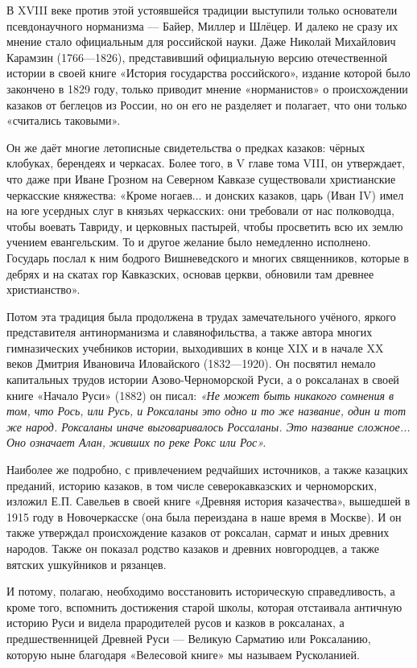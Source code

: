 В XVIII веке против этой устоявшейся традиции выступили только основатели
псевдонаучного норманизма — Байер, Миллер и Шлёцер. И далеко не сразу их мнение
стало официальным для российской науки. Даже Николай Михайлович Карамзин
(1766—1826), представивший официальную версию отечественной истории в своей
книге «История государства российского», издание которой было закончено в 1829
году, только приводит мнение «норманистов» о происхождении казаков от беглецов
из России, но он его не разделяет и полагает, что они только «считались
таковыми».

Он же даёт многие летописные свидетельства о предках казаков: чёрных клобуках,
берендеях и черкасах. Более того, в V главе тома VIII, он утверждает, что даже
при Иване Грозном на Северном Кавказе существовали христианские черкасские
княжества: «Кроме ногаев... и донских казаков, царь (Иван IV) имел на юге
усердных слуг в князьях черкасских: они требовали от нас полководца, чтобы
воевать Тавриду, и церковных пастырей, чтобы просветить всю их землю учением
евангельским. То и другое желание было немедленно исполнено. Государь послал к
ним бодрого Вишневедского и многих священников, которые в дебрях и на скатах
гор Кавказских, основав церкви, обновили там древнее христианство».

Потом эта традиция была продолжена в трудах замечательного учёного, яркого
представителя антинорманизма и славянофильства, а также автора многих
гимназических учебников истории, выходивших в конце XIX и в начале XX веков
Дмитрия Ивановича Иловайского (1832—1920). Он посвятил немало капитальных
трудов истории Азово-Черноморской Руси, а о роксаланах в своей книге «Начало
Руси» (1882) он писал: \emph{«Не может быть никакого сомнения в том, что Рось, или
Русь, и Роксаланы это одно и то же название, один и тот же народ. Роксаланы
иначе выговаривалось Россаланы. Это название сложное... Оно означает Алан,
живших по реке Рокс или Рос».}

Наиболее же подробно, с привлечением редчайших источников, а также казацких
преданий, историю казаков, в том числе северокавказских и черноморских, изложил
Е.П. Савельев в своей книге «Древняя история казачества», вышедшей в 1915 году
в Новочеркасске (она была переиздана в наше время в Москве). И он также
утверждал происхождение казаков от роксалан, сармат и иных древних народов.
Также он показал родство казаков и древних новгородцев, а также вятских
ушкуйников и рязанцев. 

И потому, полагаю, необходимо восстановить историческую справедливость, а кроме
того, вспомнить достижения старой школы, которая отстаивала античную историю
Руси и видела прародителей русов и казков в роксаланах, а предшественницей
Древней Руси — Великую Сарматию или Роксаланию, которую ныне благодаря
«Велесовой книге» мы называем Русколанией.

